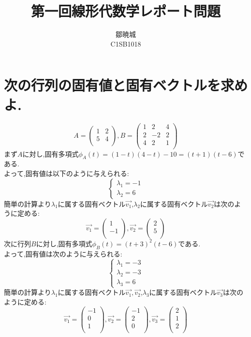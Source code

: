 \documentclass{jreport}
\begin{document}
\title{第一回線形代数学レポート問題}
\author{鄒暁城 \\ C1SB1018}
\maketitle
\newpage
\setcounter{chapter}{9}
\tableofcontents
{}
\newpage
\section{次の行列の固有値と固有ベクトルを求めよ.}
$$
	A =
	\left(
	\begin{array}{cc}
		1&2\\
		5&4\\
	\end{array}
	\right)
,
	B=
	\left(
	\begin{array}{ccc}
		1&2&4\\
		2&-2&2\\
		4&2&1\\
	\end{array}
	\right)
$$
まず$A$に対し,固有多項式$\phi_A (t) =(1-t)(4-t)-10=(t+1)(t-6)$である.\\
よって,固有値は以下のように与えられる:
$$
	\begin{cases}
	\lambda_1 = -1\\
	\lambda_2 =  6
	\end{cases}
$$
簡単の計算より$\lambda_1$に属する固有ベクトル$\vec{v_1}$,$\lambda_2$に属する固有ベクトル$\vec{v_2}$は次のように定める:
$$
\vec{v_1}=
\left(
\begin{array}{c}
1\\
-1\\
\end{array}
\right)
,
\vec{v_2}=
\left(
\begin{array}{c}
2\\
5\\
\end{array}
\right)
$$
次に行列$B$に対し,固有多項式$\phi_B (t) =(t+3)^2(t-6)$である.\\
よって,固有値は次のように与えられる:
$$
        \begin{cases}
        \lambda_1 = -3\\
	\lambda_2 = -3\\
        \lambda_3 =  6
        \end{cases}
$$
簡単の計算より$\lambda_1$に属する固有ベクトル$\vec{v_1},\vec{v_2}$,$\lambda_3$に属する固有ベクトル$\vec{v_3}$は次のように定める:
$$
\vec{v_1}=
\left(
\begin{array}{c}
-1\\
0\\
1\\
\end{array}
\right)
,
\vec{v_2}=
\left(
\begin{array}{c}
-1\\
2\\
0\\
\end{array}
\right)
,
\vec{v_3}=
\left(
\begin{array}{c}
2\\
1\\
2\\
\end{array}
\right)
$$
\end{document}
